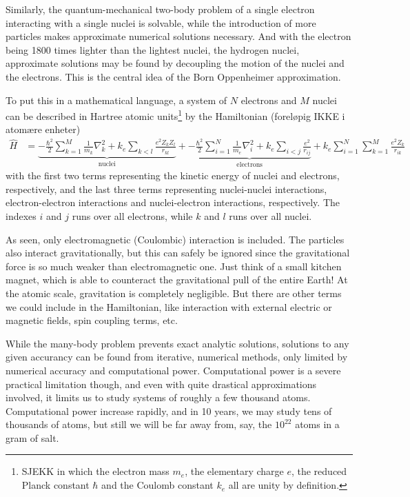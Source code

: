 \documentclass[11pt,bibliography=totoc,index=totoc]{scrbook}   %
\begin{document}
Similarly, the quantum-mechanical two-body problem of a single electron interacting with a single nuclei is solvable, while the introduction of more particles makes approximate numerical solutions necessary. 
And with the electron being 1800 times lighter than the lightest nuclei, the hydrogen nuclei, approximate solutions may be found by decoupling the motion of the nuclei and the electrons. 
This is the central idea of the Born Oppenheimer approximation\cite{BO:1927}.

To put this in a mathematical language, a system of $N$ electrons and $M$ nuclei can be described in Hartree atomic units\footnote{SJEKK
in which the electron mass $m_e$, the elementary
charge $e$, the reduced Planck constant $\hbar$ and the Coulomb constant
$k_e$ all are unity by definition.
} by the Hamiltonian (foreløpig IKKE i atomære enheter)
\begin{align}
  \hat{H} &= 
	 \underbrace{
		- \frac{\hbar^2}{2}\sum_{k=1}^M \frac{1}{m_k}\nabla_k^2 
        + k_e \sum_{k<l}\frac{e^2Z_kZ_l}{r_{kl}}
		}_{\text{nuclei}}
  +
  \underbrace{
	-\frac{\hbar^2}{2}\sum_{i=1}^N\frac{1}{m_e}\nabla_i^2
	+ k_e  \sum_{i<j}\frac{e^2}{r_{ij}}
	}_{\text{electrons}}
		+ k_e \sum_{i=1}^N\sum_{k=1}^M \frac{e^2Z_k}{r_{ik}}
  \label{eq:mol-hamiltonian}
\end{align}
with the first two terms representing the kinetic energy of nuclei and electrons, respectively, 
and the last three terms representing nuclei-nuclei interactions, electron-electron interactions
and nuclei-electron interactions, respectively.
The indexes $i$ and $j$ runs over all electrons, while $k$ and $l$ runs over all nuclei. 

As seen, only electromagnetic (Coulombic) interaction is included. 
The particles also interact gravitationally, but this can safely be ignored since the gravitational force is so much weaker than electromagnetic one.
Just think of a small kitchen magnet, which is able to counteract the gravitational pull of the entire Earth!
At the atomic scale, gravitation is completely negligible. But there are
other terms we could include in the Hamiltonian, like interaction with external electric or magnetic fields, spin coupling terms, etc.

While the many-body problem prevents exact analytic solutions, solutions to any given accurancy can be found from iterative, numerical methods, only limited by numerical accuracy and computational power. Computational power is a severe practical limitation though, and even with quite drastical approximations involved, it limits us to study systems of roughly a few thousand atoms. Computational power increase rapidly, and in 10 years, we may study tens of thousands of atoms, but still we will be far away from, say, the $10^{22}$ atoms in a gram of salt.
\end{document}
